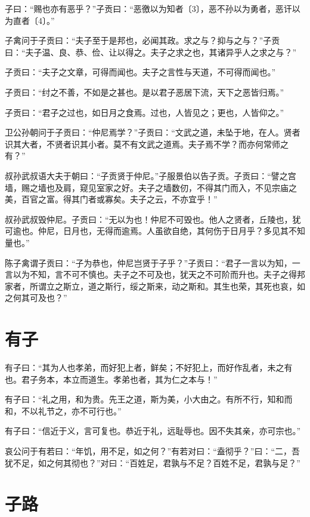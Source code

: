 \documentclass[a5paper]{ctexbook}
\begin{document}
    子曰：“赐也亦有恶乎？”子贡曰：“恶徼以为知者〔3〕，恶不孙以为勇者，恶讦以为直者〔4〕。”

    子禽问于子贡曰：“夫子至于是邦也，必闻其政。求之与？抑与之与？”子贡曰：“夫子温、良、恭、俭、让以得之。夫子之求之也，其诸异乎人之求之与？”

    子贡曰：“夫子之文章，可得而闻也。夫子之言性与天道，不可得而闻也。”

    子贡曰：“纣之不善，不如是之甚也。是以君子恶居下流，天下之恶皆归焉。”
    
    子贡曰：“君子之过也，如日月之食焉。过也，人皆见之；更也，人皆仰之。”
    
    卫公孙朝问于子贡曰：“仲尼焉学？”子贡曰：“文武之道，未坠于地，在人。贤者识其大者，不贤者识其小者。莫不有文武之道焉。夫子焉不学？而亦何常师之有？”

    叔孙武叔语大夫于朝曰：“子贡贤于仲尼。”子服景伯以告子贡。子贡曰：“譬之宫墙，赐之墙也及肩，窥见室家之好。夫子之墙数仞，不得其门而入，不见宗庙之美，百官之富。得其门者或寡矣。夫子之云，不亦宜乎！”

    叔孙武叔毁仲尼。子贡曰：“无以为也！仲尼不可毁也。他人之贤者，丘陵也，犹可逾也。仲尼，日月也，无得而逾焉。人虽欲自绝，其何伤于日月乎？多见其不知量也。”

    陈子禽谓子贡曰：“子为恭也，仲尼岂贤于子乎？”子贡曰：“君子一言以为知，一言以为不知，言不可不慎也。夫子之不可及也，犹天之不可阶而升也。夫子之得邦家者，所谓立之斯立，道之斯行，绥之斯来，动之斯和。其生也荣，其死也哀，如之何其可及也？”

    \chapter{有子}

    有子曰：“其为人也孝弟，而好犯上者，鲜矣；不好犯上，而好作乱者，未之有也。君子务本，本立而道生。孝弟也者，其为仁之本与！”

    有子曰：“礼之用，和为贵。先王之道，斯为美，小大由之。有所不行，知和而和，不以礼节之，亦不可行也。”

    有子曰：“信近于义，言可复也。恭近于礼，远耻辱也。因不失其亲，亦可宗也。”

    哀公问于有若曰：“年饥，用不足，如之何？”有若对曰：“盍彻乎？”曰：“二，吾犹不足，如之何其彻也？”对曰：“百姓足，君孰与不足？百姓不足，君孰与足？”

    \chapter{子路}
\end{document}
